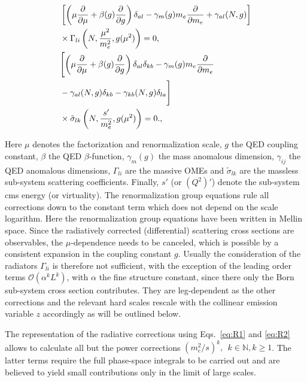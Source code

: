 \begin{align}
\label{eq:R1}
& 
\left[\left(\mu \frac{\partial}{\partial \mu} + \beta(g) \frac{\partial}{\partial g}\right) \delta_{al} 
- \gamma_m(g) m_e \frac{\partial}{\partial m_e}
+ 
\gamma_{al}(N,g) \right]\nonumber \\
&\times\Gamma_{li}\left(N, \frac{\mu^2}{m_e^2},g(\mu^2)\right) = 0,
\\
\label{eq:R2}
&\Biggl [\left(\mu \frac{\partial}{\partial \mu} + \beta(g) \frac{\partial}{\partial g}\right) \delta_{al} 
\delta_{kb}
- \gamma_m(g) m_e \frac{\partial}{\partial m_e}\nonumber \\
&- \gamma_{al}(N,g) \delta_{kb}
- \gamma_{kb}(N,g) \delta_{la} \Biggr ]\nonumber \\
&\times\tilde{\sigma}_{lk}\left(N, \frac{s'}{m_e^2},g(\mu^2)\right) = 0.
,\end{align}


Here $\mu$ denotes the factorization and renormalization scale, $g$ the QED coupling constant, $\beta$ the
QED $\beta$-function, $\gamma_m(g)$ the mass anomalous dimension,
$\gamma_{ij}$ the QED anomalous dimensions, $\Gamma_{li}$ are the massive OMEs and 
$\tilde{\sigma}_{lk}$ are the massless sub-system scattering coefficients. Finally, $s'$ (or $(Q^2)'$) denote the
sub-system cms energy (or virtuality). The renormalization group equations rule all corrections down to the
constant term which does not depend on the scale logarithm. Here the renormalization group equations have been written in 
Mellin space. Since the radiatively corrected (differential) scattering cross sections are observables, the 
$\mu$-dependence needs to be canceled, which is possible by a consistent expansion in the coupling constant $g$.
Usually the consideration of the radiators $\Gamma_{li}$ is therefore not sufficient, with the exception of the
leading order terms $\mathcal{O}(\alpha^k L^k)$, with $\alpha$ the fine structure constant, since there only the Born 
sub-system cross section contributes. They are leg-dependent
as the other corrections and the relevant hard scales rescale with the collinear emission variable $z$ accordingly
as will be outlined below.

The representation of the radiative corrections using Eqs.~\ref{eq:R1} and \ref{eq:R2} allows to calculate all 
but the power corrections $(m_e^2/s)^k,~~k \in \mathbb{N}, k \geq 1$. The latter terms require the full 
phase-space integrals to be carried out and are believed to yield small contributions only in the  limit of large
scales.

